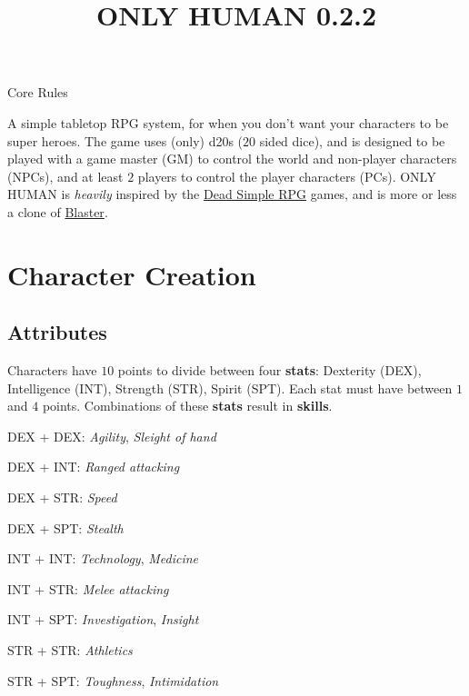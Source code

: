 \documentclass[11pt]{article}
\title{\vspace{-4ex}ONLY HUMAN 0.2.2\vspace{-6.5ex}}
\date{}
\begin{document}
\begin{multicols}{3}
  \maketitle

  \begin{center}\LARGE Core Rules\end{center}

  A simple tabletop RPG system, for when you don't want your characters to be super heroes. The game uses (only) d20s ($20$ sided dice), and is designed to be played with a game master (GM) to control the world and non-player characters (NPCs), and at least $2$ players to control the player characters (PCs). ONLY HUMAN is \textit{heavily} inspired by the \href{https://deadsimplerpg.wordpress.com/about/}{Dead Simple RPG} games, and is more or less a clone of \href{https://deadsimplerpg.wordpress.com/category/blaster-sf-rpg/}{Blaster}.

  \section*{Character Creation}

  \subsection*{Attributes}

  Characters have $10$ points to divide between four \textbf{stats}: Dexterity (DEX), Intelligence (INT), Strength (STR), Spirit (SPT). Each stat must have between $1$ and $4$ points. Combinations of these \textbf{stats} result in \textbf{skills}.

  \begin{multicols}{2}
    DEX + DEX: ​\textit{Agility​},​ \textit{Sleight of hand}

    DEX + INT: \textit{​Ranged attacking​}

    DEX + STR: ​\textit{Speed}

    DEX + SPT: ​\textit{Stealth}

    INT + INT: ​\textit{Technology​},​ \textit{Medicine}

    INT + STR: ​\textit{Melee attacking}

    INT + SPT: \textit{Investigation}, \textit{Insight}

    STR + STR: \textit{​Athletics}

    STR + SPT: \textit{​Toughness}, \textit{Intimidation}


\end{multicols}
\end{multicols}
\end{document}
